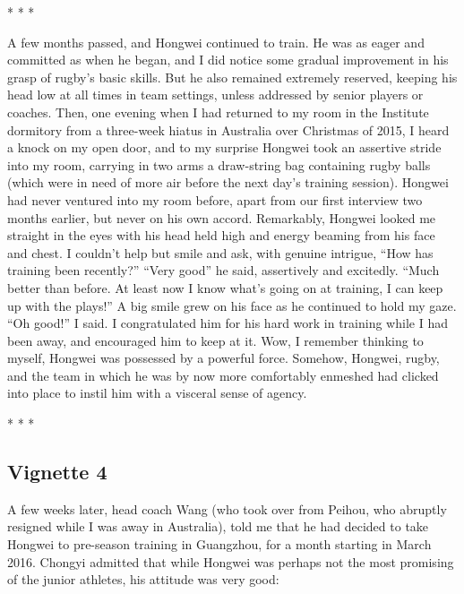 \begin{CJK}{UTF8}{gbsn}
                              \begin{center}
                                * * *
                              \end{center}

A few months passed, and Hongwei continued to train.  He was as eager and committed as when he began, and I did notice some gradual improvement in his grasp of rugby's basic skills.  But he also remained extremely reserved, keeping his head low at all times in team settings, unless addressed by senior players or coaches.  Then, one evening when I had returned to my room in the Institute dormitory from a three-week hiatus in Australia over Christmas of 2015, I heard a knock on my open door, and to my surprise Hongwei took an assertive stride into my room, carrying in two arms a draw-string bag containing rugby balls (which were in need of more air before the next day's training session).  Hongwei had never ventured into my room before, apart from our first interview two months earlier, but never on his own accord.  Remarkably, Hongwei looked me straight in the eyes with his head held high and energy beaming from his face and chest.  I couldn't help but smile and ask, with genuine intrigue, ``How has training been recently?''
``Very good'' he said, assertively and excitedly.  ``Much better than before.  At least now I know what’s going on at training, I can keep up with the plays!''  A big smile grew on his face as he continued to hold my gaze.  ``Oh good!'' I said. I congratulated him for his hard work in training while I had been away, and encouraged him to keep at it.  Wow, I remember thinking to myself, Hongwei was possessed by a powerful force.  Somehow, Hongwei, rugby, and the team in which he was by now more comfortably enmeshed had clicked into place to instil him with a visceral sense of agency.

                          \begin{center}
                            * * *
                          \end{center}


\subsection{Vignette 4}
A few weeks later, head coach Wang (who took over from Peihou, who abruptly resigned while I was away in Australia), told me that he had decided to take Hongwei to pre-season training in Guangzhou, for a month starting in March 2016.  Chongyi admitted that while Hongwei was perhaps not the most promising of the junior athletes, his attitude was very good:


\end{CJK}

